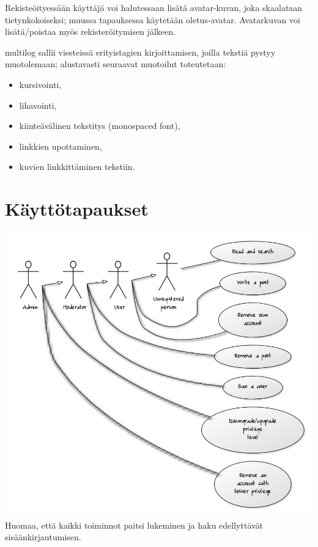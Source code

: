 \documentclass[10pt]{article}
\begin{document}
Rekisteöityessään käyttäjä voi halutessaan lisätä avatar-kuvan, joka skaalataan tietynkokoiseksi; muussa tapauksessa käytetään oletus-avatar. Avatarkuvan voi lisätä/poistaa myös rekisteröitymisen jälkeen.

multilog sallii viesteissä erityistagien kirjoittamisen, joilla tekstiä pystyy muotolemaan; alustavasti seuraavat muotoilut toteutetaan:
\begin{itemize}
  \item kursivointi,
  \item lihavointi,
  \item kiinteävälinen tekstitys (monospaced font),
  \item linkkien upottaminen,
  \item kuvien linkkittäminen tekstiin.
\end{itemize}

\section{Käyttötapaukset}
\includegraphics[width=\textwidth]{multilog_use_case_diagram}
Huomaa, että kaikki toiminnot paitsi lukeminen ja haku edellyttävät sisäänkirjautumisen.
\end{document}
